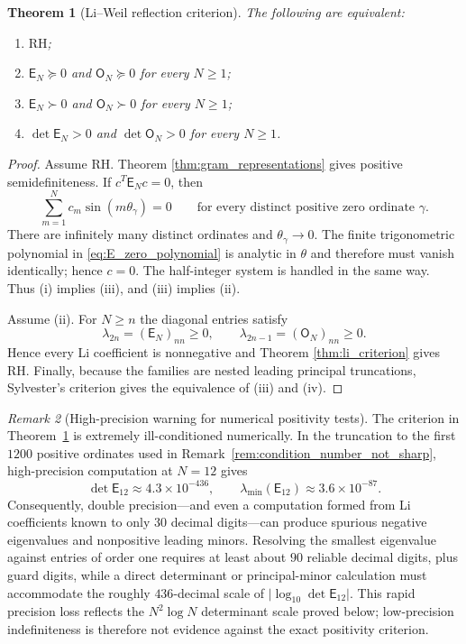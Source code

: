 \documentclass[preprint,12pt]{elsarticle}
\numberwithin{equation}{section}
\theoremstyle{plain}
\newtheorem{theorem}{Theorem}[section]
\theoremstyle{definition}
\theoremstyle{remark}
\newtheorem{remark}[theorem]{Remark}
\newcommand{\RH}{\mathrm{RH}}
\newcommand{\E}{\mathsf E}
\newcommand{\Omat}{\mathsf O}
\begin{document}
\begin{theorem}[Li--Weil reflection criterion]
\label{thm:main_criterion}
The following are equivalent:
\begin{enumerate}[label=(\roman*)]
\item $\RH$;
\item $\E_N\succeq0$ and $\Omat_N\succeq0$ for every $N\ge1$;
\item $\E_N\succ0$ and $\Omat_N\succ0$ for every $N\ge1$;
\item $\det\E_N>0$ and $\det\Omat_N>0$ for every $N\ge1$.
\end{enumerate}
\end{theorem}

\begin{proof}
Assume $\RH$. Theorem \ref{thm:gram_representations} gives positive semidefiniteness. If $c^T\E_Nc=0$, then
\begin{equation}
\sum_{m=1}^{N}c_m\sin(m\theta_\gamma)=0
\qquad\text{for every distinct positive zero ordinate }\gamma.
\label{eq:E_zero_polynomial}
\end{equation}
There are infinitely many distinct ordinates and $\theta_\gamma\to0$. The finite trigonometric polynomial in \eqref{eq:E_zero_polynomial} is analytic in $\theta$ and therefore must vanish identically; hence $c=0$. The half-integer system is handled in the same way. Thus (i) implies (iii), and (iii) implies (ii).

Assume (ii). For $N\ge n$ the diagonal entries satisfy
\begin{equation}
\lambda_{2n}=(\E_N)_{nn}\ge0,
\qquad
\lambda_{2n-1}=(\Omat_N)_{nn}\ge0.
\label{eq:recover_li_from_diagonal}
\end{equation}
Hence every Li coefficient is nonnegative and Theorem \ref{thm:li_criterion} gives $\RH$. Finally, because the families are nested leading principal truncations, Sylvester's criterion gives the equivalence of (iii) and (iv).
\end{proof}

\begin{remark}[High-precision warning for numerical positivity tests]
\label{rem:numerical_positivity_precision}
The criterion in Theorem~\ref{thm:main_criterion} is extremely ill-conditioned numerically.
In the truncation to the first \(1200\) positive ordinates used in
Remark~\ref{rem:condition_number_not_sharp}, high-precision computation at \(N=12\) gives
\[
\det\E_{12}\approx4.3\times10^{-436},
\qquad
\lambda_{\min}(\E_{12})\approx3.6\times10^{-87}.
\]
Consequently, double precision---and even a computation formed from Li coefficients known to
only \(30\) decimal digits---can produce spurious negative eigenvalues and nonpositive leading
minors.  Resolving the smallest eigenvalue against entries of order one requires at least about
\(90\) reliable decimal digits, plus guard digits, while a direct determinant or principal-minor
calculation must accommodate the roughly \(436\)-decimal scale of
\(\lvert\log_{10}\det\E_{12}\rvert\).  This rapid precision loss reflects the
\(N^2\log N\) determinant scale proved below; low-precision indefiniteness is therefore not
evidence against the exact positivity criterion.
\end{remark}
\end{document}
